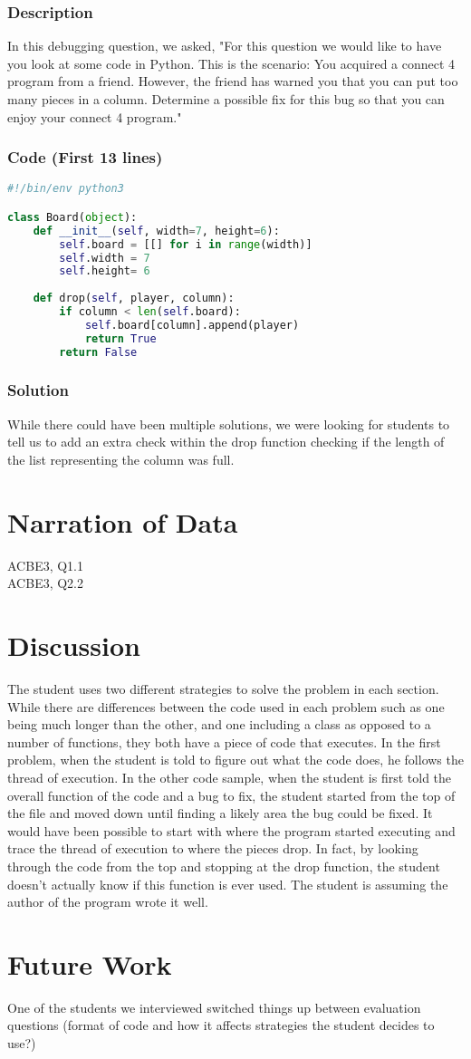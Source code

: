 \documentclass{article}
\begin{document}
\subsubsection{Description}
In this debugging question, we asked, "For this question we would like to have you look at some code in Python. This is the scenario: You acquired a connect 4 program from a friend. However, the friend has warned you that you can put too many pieces in a column. Determine a possible fix for this bug so that you can enjoy your connect 4 program."
\subsubsection{Code (First 13 lines)}
\begin{lstlisting}[language=python]
#!/bin/env python3

class Board(object):
	def __init__(self, width=7, height=6):
		self.board = [[] for i in range(width)]
		self.width = 7
		self.height= 6
	
	def drop(self, player, column):
		if column < len(self.board):
			self.board[column].append(player)
			return True
		return False
\end{lstlisting}
\subsubsection{Solution}
While there could have been multiple solutions, we were looking for students to tell us to add an extra check within the drop function checking if the length of the list representing the column was full.

\section{Narration of Data}
ACBE3, Q1.1 \\
ACBE3, Q2.2 

\section{Discussion}
The student uses two different strategies to solve the problem in each section. While there are differences between the code used in each problem such as one being much longer than the other, and one including a class as opposed to a number of functions, they both have a piece of code that executes. In the first problem, when the student is told to figure out what the code does, he follows the thread of execution. In the other code sample, when the student is first told the overall function of the code and a bug to fix, the student started from the top of the file and moved down until finding a likely area the bug could be fixed. It would have been possible to start with where the program started executing and trace the thread of execution to where the pieces drop. In fact, by looking through the code from the top and stopping at the drop function, the student doesn't actually know if this function is ever used. The student is assuming the author of the program wrote it well. 

\section{Future Work}
One of the students we interviewed switched things up between evaluation questions (format of code and how it affects strategies the student decides to use?)
\end{document}
